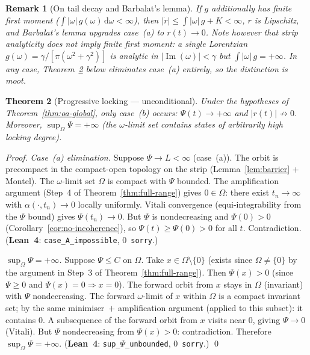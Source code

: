 \documentclass[11pt,a4paper]{article}
\newtheorem{theorem}{Theorem}[section]
\newtheorem{remark}[theorem]{Remark}
\theoremstyle{definition}
\DeclareMathOperator{\im}{Im}
\begin{document}
\begin{remark}[On tail decay and Barbalat's lemma]
If $g$ additionally has finite first moment ($\int|\omega|\,g(\omega)\,\mathrm{d}\omega < \infty$), then $|\dot{r}| \leq \int|\omega|\,g + K < \infty$, $r$ is Lipschitz, and Barbalat's lemma upgrades case~(a) to $r(t) \to 0$. Note however that \emph{strip analyticity does not imply finite first moment}: a single Lorentzian $g(\omega) = \gamma/[\pi(\omega^2+\gamma^2)]$ is analytic in $|\im(\omega)| < \gamma$ but $\int|\omega|\,g = +\infty$. In any case, Theorem~\ref{thm:progressive-locking} below eliminates case~(a) entirely, so the distinction is moot.
\end{remark}

\begin{theorem}[Progressive locking --- unconditional]\label{thm:progressive-locking}
Under the hypotheses of Theorem~\ref{thm:oa-global}, only case~(b) occurs: $\Psi(t) \to +\infty$ and $|r(t)| \not\to 0$. Moreover, $\sup_\Omega\Psi = +\infty$ (the $\omega$-limit set contains states of arbitrarily high locking degree).
\end{theorem}

\begin{proof}
\emph{Case~(a) elimination.} Suppose $\Psi \to L < \infty$ (case~(a)). The orbit is precompact in the compact-open topology on the strip (Lemma~\ref{lem:barrier} + Montel). The $\omega$-limit set $\Omega$ is compact with $\Psi$ bounded. The amplification argument (Step~4 of Theorem~\ref{thm:full-range}) gives $0 \in \Omega$: there exist $t_n \to \infty$ with $\alpha(\cdot, t_n) \to 0$ locally uniformly. Vitali convergence (equi-integrability from the $\Psi$ bound) gives $\Psi(t_n) \to 0$. But $\Psi$ is nondecreasing and $\Psi(0) > 0$ (Corollary~\ref{cor:no-incoherence}), so $\Psi(t) \geq \Psi(0) > 0$ for all $t$. Contradiction. (\textbf{Lean~4}: \texttt{case\_A\_impossible}, 0~\texttt{sorry}.)

\emph{$\sup_\Omega\Psi = +\infty$.} Suppose $\Psi \leq C$ on $\Omega$. Take $x \in \Omega \setminus \{0\}$ (exists since $\Omega \neq \{0\}$ by the argument in Step~3 of Theorem~\ref{thm:full-range}). Then $\Psi(x) > 0$ (since $\Psi \geq 0$ and $\Psi(x) = 0 \Rightarrow x = 0$). The forward orbit from $x$ stays in $\Omega$ (invariant) with $\Psi$ nondecreasing. The forward $\omega$-limit of $x$ within $\Omega$ is a compact invariant set; by the same minimiser~$+$ amplification argument (applied to this subset): it contains $0$. A subsequence of the forward orbit from $x$ visits near $0$, giving $\Psi \to 0$ (Vitali). But $\Psi$ nondecreasing from $\Psi(x) > 0$: contradiction. Therefore $\sup_\Omega\Psi = +\infty$. (\textbf{Lean~4}: \texttt{sup\_$\Psi$\_unbounded}, 0~\texttt{sorry}.) \qed
\end{proof}
\end{document}

